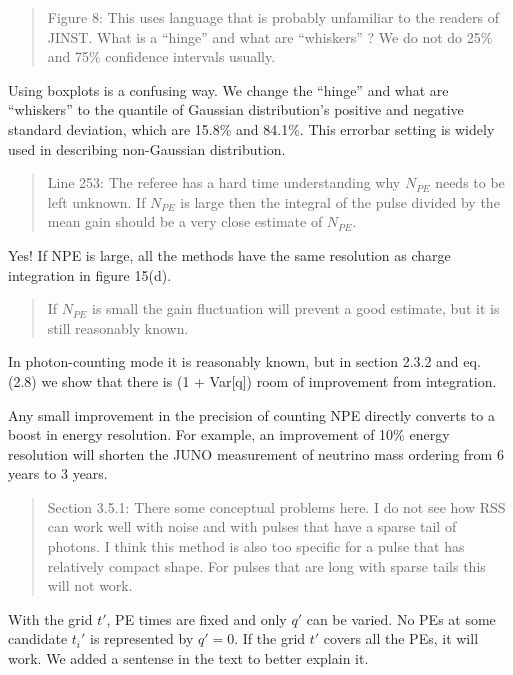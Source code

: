 \documentclass[12pt]{article}
\begin{document}
\begin{quote}
Figure 8: This uses language that is probably unfamiliar to the readers of JINST. What is a ``hinge'' and what are ``whiskers'' ? We do not do 25\% and 75\% confidence intervals usually.
\end{quote}

Using boxplots is a confusing way. We change the ``hinge'' and what are ``whiskers'' to the quantile of Gaussian distribution's positive and negative standard deviation, which are 15.8\% and 84.1\%. This errorbar setting is widely used in describing non-Gaussian distribution.

\begin{quote}
Line 253: The referee has a hard time understanding why $N_{PE}$ needs to be left unknown. If $N_{PE}$ is large then the integral of the pulse divided by the mean gain should be a very close estimate of $N_{PE}$. 
\end{quote}

Yes! If NPE is large, all the methods have the same resolution as charge integration in figure 15(d).

\begin{quote}
If $N_{PE}$ is small the gain fluctuation will prevent a good estimate, but it is still reasonably known.
\end{quote}

In photon-counting mode it is reasonably known, but in section 2.3.2 and eq. (2.8) we show that there is (1 + Var[q]) room of improvement from integration.

Any small improvement in the precision of counting NPE directly converts to a boost in energy resolution. For example, an improvement of 10\% energy resolution will shorten the JUNO measurement of neutrino mass ordering from 6 years to 3 years.

\begin{quote}
Section 3.5.1: There some conceptual problems here. I do not see how RSS can work well with noise and with pulses that have a sparse tail of photons. I think this method is also too specific for a pulse that has relatively compact shape. For pulses that are long with sparse tails this will not work.
\end{quote}

With the grid $t'$, PE times are fixed and only $q'$ can be varied.  No PEs at some candidate $t_i'$ is represented by $q'=0$.  If the grid $t'$ covers all the PEs, it will work.  We added a sentense in the text to better explain it.
\end{document}
